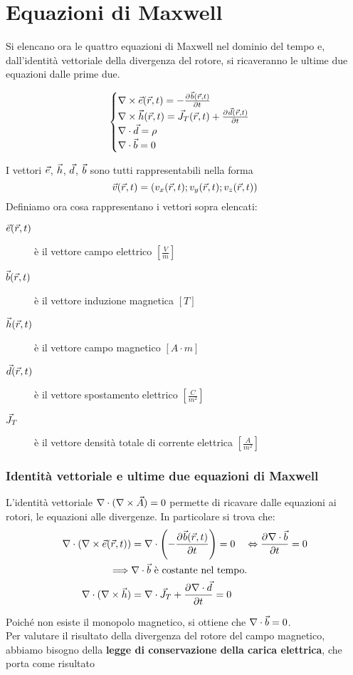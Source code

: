 \section{Equazioni di Maxwell}
Si elencano ora le quattro equazioni di Maxwell nel dominio del tempo e, dall'identità
vettoriale della divergenza del rotore, si ricaveranno le ultime due equazioni dalle prime due.

\begin{equation}\begin{cases}
  \nabla\times \vec{e}(\vec{r},t) = -\frac{\partial^{} {\vec{b}(\vec{r},t)}}{\partial {t}^{}} \\
  \nabla\times \vec{h}(\vec{r},t) = \vec{J}_T(\vec{r},t) + \frac{\partial^{} {\vec{d}(\vec{r},t)}}{\partial {t}^{}} \\
  \nabla\cdot \vec{d} = \rho \\
  \nabla\cdot \vec{b} = 0
\end{cases}\label{eq:maxwell}\end{equation}

I vettori $\vec{e}$, $\vec{h}$, $\vec{d}$, $\vec{b}$ sono tutti rappresentabili nella forma
$$\vec{v}(\vec{r},t) = \left(v_x(\vec{r},t);v_y(\vec{r},t);v_z(\vec{r},t)\right)$$
Definiamo ora cosa rappresentano i vettori sopra elencati:
\begin{description}
  \item[$\vec{e}(\vec{r},t)$ ] è il vettore campo elettrico $\left[\frac{V}{m}\right]$
  \item[$\vec{b}(\vec{r},t)$] è il vettore induzione magnetica $[T]$
  \item[$\vec{h}(\vec{r},t)$] è il vettore campo magnetico $[A \cdot m]$
  \item[$\vec{d}(\vec{r},t)$] è il vettore spostamento elettrico $\left[\frac{C}{m^2}\right]$
  \item[$\vec{J}_T$] è il vettore densità totale di corrente elettrica $\left[\frac{A}{m^2}\right]$
\end{description}

\subsubsection{Identità vettoriale e ultime due equazioni di Maxwell}
L'identità vettoriale $\nabla\cdot (\nabla\times \vec{A}) = 0$ permette di ricavare
dalle equazioni ai rotori, le equazioni alle divergenze. In particolare si trova che:
\begin{equation}\begin{split}
  \nabla\cdot (\nabla\times \vec{e}(\vec{r},t)) &= \nabla\cdot \left(-\frac{\partial^{} {\vec{b}(\vec{r},t)}}{\partial {t}^{}}\right)=0 \quad \Leftrightarrow \frac{\partial^{} {\nabla\cdot \vec{b}}}{\partial {t}^{}}=0\\
  \implies & \nabla\cdot \vec{b} \text{ è costante nel tempo.}\\
  \nabla\cdot(\nabla\times \vec{h}) &= \nabla\cdot \vec{J}_T + \frac{\partial^{} {\nabla\cdot \vec{d}}}{\partial {t}^{}}=0
\end{split}\end{equation}

Poiché non esiste il monopolo magnetico, si ottiene che $\nabla\cdot\vec{b} =0$.\\
Per valutare il risultato della divergenza del rotore del campo magnetico, abbiamo bisogno della
\textbf{legge di conservazione della carica elettrica}, che porta come risultato
\begin{equation}
  
\end{equation}
